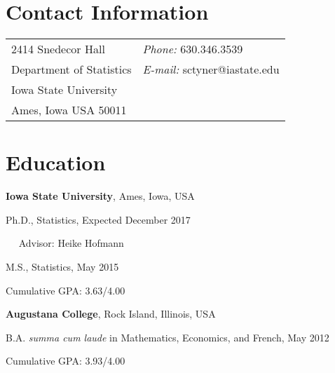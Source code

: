 \documentclass[margin,line]{res}
\newenvironment{list1}{
  \begin{list}{\ding{113}}{%
      \setlength{\itemsep}{0in}
      \setlength{\parsep}{0in} \setlength{\parskip}{0in}
      \setlength{\topsep}{0in} \setlength{\partopsep}{0in} 
      \setlength{\leftmargin}{0.17in}}}{\end{list}}
\begin{document}

\begin{resume}
\section{\sc Contact Information}
\vspace{.05in}
\begin{tabular}{@{}p{2in}p{4in}}
2414 Snedecor Hall  & {\it Phone:}  630.346.3539 \\            
Department of Statistics  &  {\it E-mail:} sctyner@iastate.edu\\   
Iowa State University\\         
Ames, Iowa USA 50011 
\end{tabular}

\section{\sc Education}
{\bf Iowa State University}, Ames, Iowa, USA\\
\vspace*{-.1in}
\begin{list1}
\item[]Ph.D., Statistics, Expected December 2017 
\item[] $\quad$ Advisor: Heike Hofmann
\item[]M.S., Statistics, May 2015
\item[]Cumulative GPA: 3.63/4.00
\end{list1}
{\bf Augustana College}, Rock Island, Illinois, USA\\
\vspace*{-.1in}
\begin{list1}
\item[]B.A. \textit{summa cum laude} in Mathematics, Economics, and French, May 2012
\item[]Cumulative GPA: 3.93/4.00
\end{list1}


\end{resume}
\end{document}
